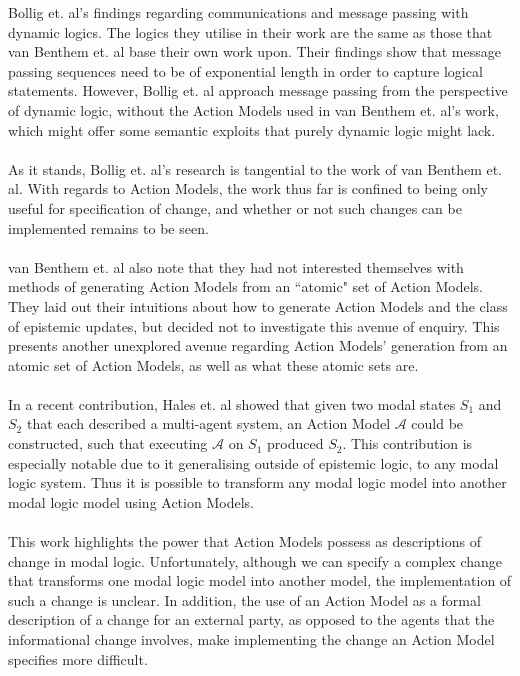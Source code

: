 \documentclass[12pt, a4paper, twoside]{article}
\begin{document}
Bollig et. al's findings regarding communications and message passing with
dynamic logics.
The logics they utilise in their work are the same as those that van Benthem et.
al base their own work upon.
Their findings show that message passing sequences need to be of exponential
length in order to capture logical statements. \citep{bollig07mps}
However, Bollig et. al approach message passing from the perspective of dynamic
logic, without the Action Models used in van Benthem et. al's work, which might
offer some semantic exploits that purely dynamic logic might lack.\\
\\
As it stands, Bollig et. al's research is tangential to the work of van Benthem
et. al.
With regards to Action Models, the work thus far is confined to being only
useful for specification of change, and whether or not such changes can be
implemented remains to be seen.\\
\\
van Benthem et. al also note that they had not interested themselves with methods of
generating Action Models from an ``atomic" set of Action Models.
\citep{benthem2006lcc}
They laid out their intuitions about how to generate Action Models and the class
of epistemic updates, but decided not to investigate this avenue of enquiry.
This presents another unexplored avenue regarding Action Models' generation from
an atomic set of Action Models, as well as what these atomic sets are.\\
\\
In a recent contribution, Hales et. al showed that given two modal states $S_1$
and $S_2$ that each described a multi-agent system, an Action Model $\mathcal{A}$
could be constructed, such that executing $\mathcal{A}$ on $S_1$ produced $S_2$.
This contribution is especially notable due to it generalising outside of
epistemic logic, to any modal logic system.
Thus it is possible to transform any modal logic model into another modal logic
model using Action Models.\citep{hales13synthesis}\\
\\
This work highlights the power that Action Models possess as descriptions of
change in modal logic.
Unfortunately, although we can specify a complex change that transforms one modal
logic model into another model, the implementation of such a change is unclear.
In addition, the use of an Action Model as a formal description of a change for
an external party, as opposed to the agents that the informational change
involves, make implementing the change an Action Model specifies more
difficult.
\end{document}
